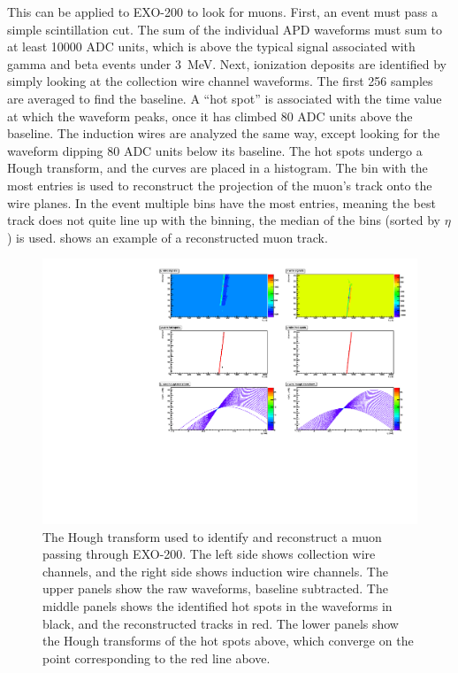 \documentclass[herrin-thesis.tex]{subfiles}
\begin{document}
This can be applied to EXO-200 to look for muons. First, an event must pass a simple scintillation cut. The sum of the individual APD waveforms must sum to at least 10000 ADC units, which is  above the typical signal associated with gamma and beta events under \SI{3}{MeV}. Next, ionization deposits are identified by simply looking at the collection wire channel waveforms. The first 256 samples are averaged to find the baseline.  A ``hot spot'' is associated with the time value at which the waveform peaks, once it has climbed 80 ADC units above the baseline. The induction wires are analyzed the same way, except looking for the waveform dipping 80 ADC units below its baseline. The hot spots undergo a Hough transform, and the curves are placed in a histogram. The bin with the most entries is used to reconstruct the projection of the muon's track onto the wire planes. In the event multiple bins have the most entries, meaning the best track does not quite line up with the binning, the median of the bins (sorted by \(\eta\)) is used.  shows an example of a reconstructed muon track.

\begin{figure}[htbp]
\centering
\includegraphics[width=1\columnwidth]{./plots/muon_houghtransform_run_4685_ev_67.pdf}
\caption[Identifying a muon with the Hough transform]{The Hough transform used to identify and reconstruct a muon passing through EXO-200. The left side shows collection wire channels, and the right side shows induction wire channels. The upper panels show the raw waveforms, baseline subtracted. The middle panels shows the identified hot spots in the waveforms in black, and the reconstructed tracks in red. The lower panels show the Hough transforms of the hot spots above, which converge on the point corresponding to the red line above.}
\label{fig:muon:houghtransform}
\end{figure}
\end{document}
